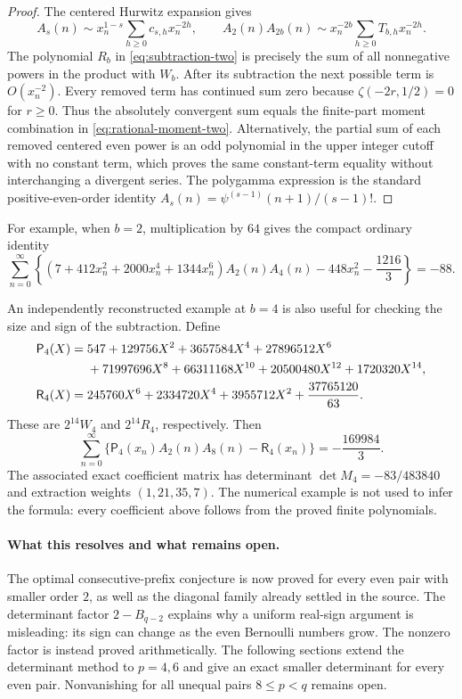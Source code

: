 \documentclass[11pt,a4paper]{article}
\numberwithin{equation}{section}
\theoremstyle{plain}
\theoremstyle{definition}
\theoremstyle{remark}
\begin{document}
\begin{proof}
The centered Hurwitz expansion gives
\[
 A_s(n)\sim x_n^{1-s}\sum_{h\geq0}c_{s,h}x_n^{-2h},
 \qquad
 A_2(n)A_{2b}(n)\sim
       x_n^{-2b}\sum_{h\geq0}T_{b,h}x_n^{-2h}.
\]
The polynomial $R_b$ in \eqref{eq:subtraction-two} is precisely the
sum of all nonnegative powers in the product with $W_b$.
After its subtraction the next possible term is $O(x_n^{-2})$.
Every removed term has continued sum zero because
$\zeta(-2r,1/2)=0$ for $r\geq0$.  Thus the absolutely convergent
sum equals the finite-part moment combination in
\eqref{eq:rational-moment-two}.  Alternatively, the partial sum of
each removed centered even power is an odd polynomial in the upper
integer cutoff with no constant term, which proves the same
constant-term equality without interchanging a divergent series.
The polygamma expression is the standard positive-even-order
identity $A_s(n)=\psi^{(s-1)}(n+1)/(s-1)!$.
\end{proof}

For example, when $b=2$, multiplication by $64$ gives the compact
ordinary identity
\begin{equation}\label{eq:ordinary-24}
 \sum_{n=0}^{\infty}\left\{
 (7+412x_n^2+2000x_n^4+1344x_n^6)A_2(n)A_4(n)
 -448x_n^2-\frac{1216}{3}
 \right\}=-88.
\end{equation}

An independently reconstructed example at $b=4$ is also useful for
checking the size and sign of the subtraction. Define
\begin{align}
 \mathsf P_4(X)={}&547+129756X^2+3657584X^4+27896512X^6\notag\\
 &+71997696X^8+66311168X^{10}+20500480X^{12}+1720320X^{14},
 \label{eq:P28-example}\\
 \mathsf R_4(X)={}&245760X^6+2334720X^4+3955712X^2
                                    +\frac{37765120}{63}.
 \label{eq:R28-example}
\end{align}
These are $2^{14}W_4$ and $2^{14}R_4$, respectively. Then
\begin{equation}\label{eq:ordinary-28}
 \boxed{\displaystyle
 \sum_{n=0}^{\infty}
    \{\mathsf P_4(x_n)A_2(n)A_8(n)-\mathsf R_4(x_n)\}
       =-\frac{169984}{3}.}
\end{equation}
The associated exact coefficient matrix has determinant
$\det M_4=-83/483840$ and extraction weights $(1,21,35,7)$.
The numerical example is not used to infer the formula: every coefficient
above follows from the proved finite polynomials.

\paragraph{What this resolves and what remains open.}
The optimal consecutive-prefix conjecture is now proved for every
even pair with smaller order $2$, as well as the diagonal family
already settled in the source.  The determinant factor
$2-B_{q-2}$ explains why a uniform real-sign argument is misleading:
its sign can change as the even Bernoulli numbers grow.  The nonzero
factor is instead proved arithmetically.  The following sections extend the determinant method to $p=4,6$ and give
an exact smaller determinant for every even pair. Nonvanishing for all
unequal pairs $8\le p<q$ remains open.
\end{document}
